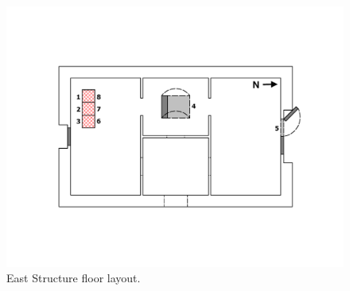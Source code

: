 \documentclass[12pt,oneside]{book}
\begin{document}
\begin{figure}[!ht]
	\includegraphics[width=\columnwidth]{../Figures/Floor_Plans/East_Structure_Test_6}
	\caption[Dimensioned floor plan of the East Structure.]{East Structure floor layout.}
	\label{fig:east_test_6}
\end{figure}
\end{document}
